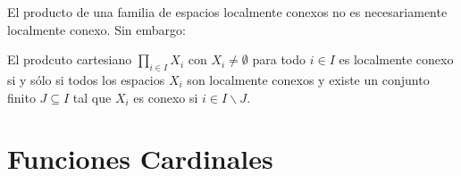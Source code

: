 \documentclass[12pt]{report}
\theoremstyle{largebreak}
\begin{document}
    El producto de una familia de espacios localmente conexos no es necesariamente localmente conexo. Sin embargo:

    \begin{theor}
        El prodcuto cartesiano $\prod_{i\in I}X_i$ con $X_i\neq\emptyset$ para todo $i\in I$ es localmente conexo si y sólo si todos los espacios $X_i$ son localmente conexos y existe un conjunto finito $J\subseteq I$ tal que $X_i$ es conexo si $i\in I\backslash J$.
    \end{theor}

    \chapter{Funciones Cardinales}

        
\end{document}
